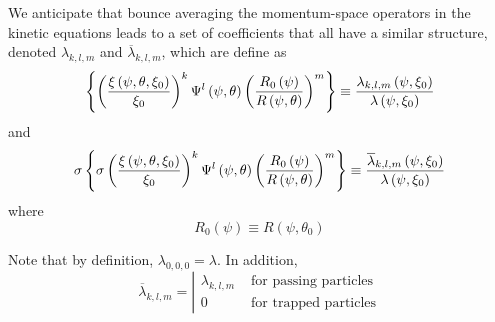 We anticipate that bounce averaging the momentum-space operators in the
kinetic equations leads to a set of coefficients that all have a similar
structure, denoted $\lambda_{k,l,m}$ and $\overline{\lambda}_{k,l,m}$, which
are define as 
\begin{equation}
\left\{ \left( \frac{\xi\left( \psi,\theta,\xi_{0}\right) }{\xi_{0}}\right)
^{k}\Psi^{l}\left( \psi,\theta\right) \left( \frac{R_{0}\left( \psi\right) }{%
R\left( \psi,\theta\right) }\right) ^{m}\right\} \equiv\frac{%
\lambda_{k,l,m}\left( \psi,\xi_{0}\right) }{\lambda\left(
\psi,\xi_{0}\right) }   \label{lkm}
\end{equation}
and 
\begin{equation}
\sigma\left\{ \sigma\left( \frac{\xi\left( \psi,\theta,\xi_{0}\right) }{%
\xi_{0}}\right) ^{k}\Psi^{l}\left( \psi,\theta\right) \left( \frac {%
R_{0}\left( \psi\right) }{R\left( \psi,\theta\right) }\right) ^{m}\right\}
\equiv\frac{\overline{\lambda}_{k,l,m}\left( \psi,\xi _{0}\right) }{%
\lambda\left( \psi,\xi_{0}\right) }   \label{lkmb}
\end{equation}
where 
\begin{equation}
R_{0}\left( \psi\right) \equiv R\left( \psi,\theta_{0}\right)
\end{equation}

Note that by definition, $\lambda_{0,0,0}=\lambda$. In addition, 
\begin{equation}
\overline{\lambda}_{k,l,m}=\left\vert 
\begin{array}{ll}
\lambda_{k,l,m} & \text{ for passing particles} \\ 
0 & \text{ for trapped particles}%
\end{array}
\right.
\end{equation}
